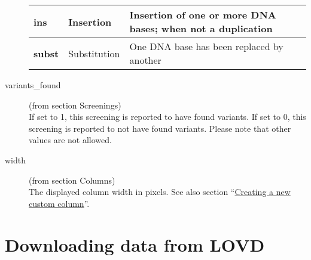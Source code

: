 \documentclass[a4paper,oneside,openany,12pt]{memoir}
\begin{document}
\begin{description}
\begin{tabular}{>{\bfseries}p{2.2cm} p{3.4cm} p{9cm}}
    ins & Insertion & Insertion of one or more DNA bases; when not a duplication\\ \hline
    subst & Substitution & One DNA base has been replaced by another\\ \hline
  \end{tabular}
  \item[variants\_found] (from section Screenings)\hfill \\
  If set to 1, this screening is reported to have found variants.
  If set to 0, this screening is reported to not have found variants.
  Please note that other values are not allowed.
  \item[width] (from section Columns)\hfill \\
  The displayed column width in pixels.
  See also section ``\hyperlink{sec:custom_column_create}{Creating a new custom column}''.
\end{description}





\hypertarget{sec:download_data}{}
\section{Downloading data from LOVD}

\begin{comment}
In case you provided search terms, only the results will be included in the download file.
Also the order in the downloaded file is equal to the order of the entries on the screen.
\end{comment}



\hypertarget{ssec:download_full_data}{}
\end{document}
